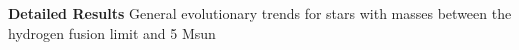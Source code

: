 \textbf{Detailed Results}
General evolutionary trends for stars with masses between the hydrogen fusion limit and 5 Msun